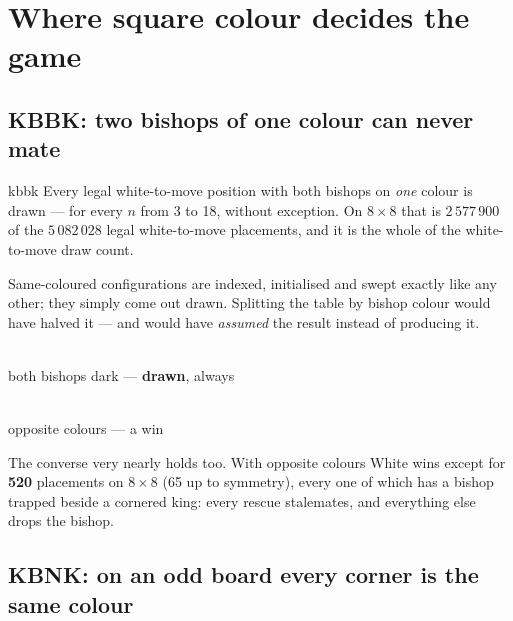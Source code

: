 \documentclass[11pt]{article}
\begin{document}
\section{Where square colour decides the game}\label{sec:colour}

\subsection{KBBK: two bishops of one colour can never mate}\label{sub:kbbk-colour}

\begin{result}[title={Computed, not assumed}]{kbbk}
Every legal white-to-move position with both bishops on \emph{one} colour is
drawn --- for every $n$ from 3 to 18, without exception. On $8\times8$ that is
$2\,577\,900$ of the $5\,082\,028$ legal white-to-move placements, and it is the
whole of the white-to-move draw count.

\smallskip
Same-coloured configurations are indexed, initialised and swept exactly like
any other; they simply come out drawn. Splitting the table by bishop colour
would have halved it --- and would have \emph{assumed} the result instead of
producing it.
\end{result}

\begin{center}
\begin{minipage}{0.42\textwidth}\centering
  \\[1mm]
  {\small both bishops dark --- \textbf{drawn}, always}
\end{minipage}\hfill
\begin{minipage}{0.42\textwidth}\centering
  \\[1mm]
  {\small opposite colours --- a win}
\end{minipage}
\end{center}

\noindent
The converse very nearly holds too. With opposite colours White wins except for
\textbf{520} placements on $8\times8$ (65 up to symmetry), every one of which
has a bishop trapped beside a cornered king: every rescue stalemates, and
everything else drops the bishop.

\subsection{KBNK: on an odd board every corner is the same colour}\label{sub:kbnk-colour}
\end{document}
